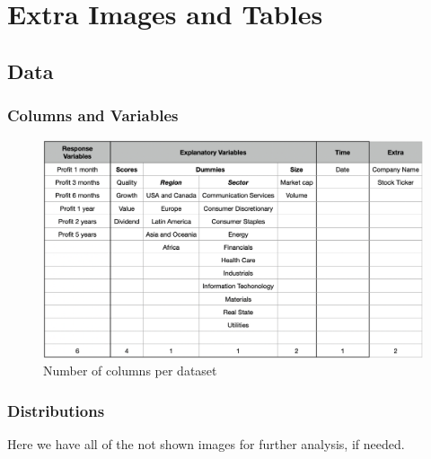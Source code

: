 \documentclass[11pt,english,a4paper,hidelinks]{book}
\begin{document}
\chapter{Extra Images and Tables}
\section{Data}

\subsection{Columns and Variables}

\begin{figure}[H]
    \centering
    \includegraphics[width=1\textwidth]{images/tweenvest/Number of columns.png}
    \caption{Number of columns per dataset}
    \label{fig:number_of_columns}
\end{figure}

\subsection{Distributions}
Here we have all of the not shown images for further analysis, if needed.
\end{document}
